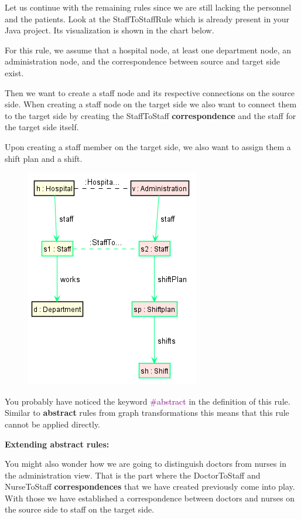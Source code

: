 Let us continue with the remaining rules since we are still lacking the personnel and the patients. Look at the \textsf{StaffToStaffRule} which is already present in your Java project. Its visualization is shown in the chart below.

For this rule, we assume that a hospital node, at least one department node, an administration node, and the correspondence between source and target side exist.

Then we want to create a staff node and its respective connections on the source side. When creating a staff node on the target side we also want to connect them to the target side by creating the \textsf{StaffToStaff} \textbf{correspondence} and the staff for the target side itself.

Upon creating a staff member on the target side, we also want to assign them a shift plan and a shift.

\begin{figure}[h]
    \centering
    \includegraphics[scale=0.6 ]{pictures/StaffToStaffRule.png}
    \caption{}
    \label{TGG rule creation}
\end{figure}

You probably have noticed the keyword \textcolor{Purple}{\#abstract} in the definition of this rule. Similar to \textbf{abstract} rules from graph transformations this means that this rule cannot be applied directly.\newline

\textbf{Extending abstract rules:}

You might also wonder how we are going to distinguish doctors from nurses in the administration view. That is the part where the \textsf{DoctorToStaff} and \textsf{NurseToStaff} \textbf{correspondences} that we have created previously come into play. With those we have established a correspondence between doctors and nurses on the source side to staff on the target side.

